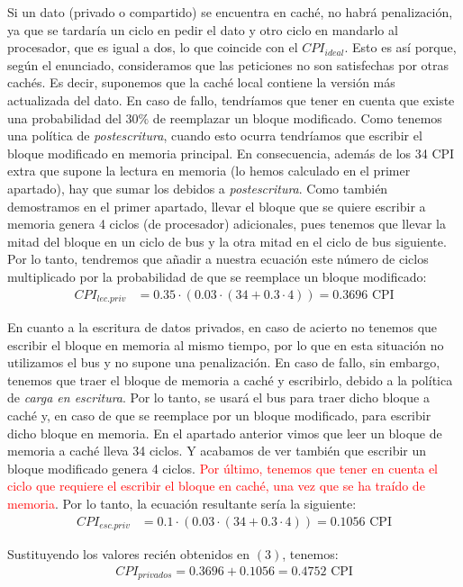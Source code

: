 \documentclass[12pt,a4paper]{article}
\begin{document}
Si un dato (privado o compartido) se encuentra en caché, no habrá penalización, ya que se tardaría un ciclo en pedir el dato y otro ciclo en mandarlo al procesador, que es igual a dos, lo que coincide con el $CPI_{ideal}$. Esto es así porque, según el enunciado, consideramos que las peticiones no son satisfechas por otras cachés. Es decir, suponemos que la caché local contiene la versión más actualizada del dato. En caso de fallo, tendríamos que tener en cuenta que existe una probabilidad del $30\%$ de reemplazar un bloque modificado. Como tenemos una política de \textit{postescritura}, cuando esto ocurra tendríamos que escribir el bloque modificado en memoria principal. En consecuencia, además de los 34 CPI extra que supone la lectura en memoria (lo hemos calculado en el primer apartado), hay que sumar los debidos a \textit{postescritura}. Como también demostramos en el primer apartado, llevar el bloque que se quiere escribir a memoria genera 4 ciclos (de procesador) adicionales, pues tenemos que llevar la mitad del bloque en un ciclo de bus y la otra mitad en el ciclo de bus siguiente. Por lo tanto, tendremos que añadir a nuestra ecuación este número de ciclos multiplicado por la probabilidad de que se reemplace un bloque modificado:
\begin{align*}
CPI_{lec.priv}&=0.35\cdot (0.03\cdot (34 + 0.3\cdot 4))=0.3696\text{ CPI}
\end{align*}

En cuanto a la escritura de datos privados, en caso de acierto no tenemos que escribir el bloque en memoria al mismo tiempo, por lo que en esta situación no utilizamos el bus y no supone una penalización. En caso de fallo, sin embargo, tenemos que traer el bloque de memoria a caché y escribirlo, debido a la política de \textit{carga en escritura}. Por lo tanto, se usará el bus para traer dicho bloque a caché y, en caso de que se reemplace por un bloque modificado, para escribir dicho bloque en memoria. En el apartado anterior vimos que leer un bloque de memoria a caché lleva 34 ciclos. Y acabamos de ver también que escribir un bloque modificado genera 4 ciclos. \textcolor{red}{Por último, tenemos que tener en cuenta el ciclo que requiere el escribir el bloque en caché, una vez que se ha traído de memoria}. Por lo tanto, la ecuación resultante sería la siguiente:
\begin{align*}
CPI_{esc.priv}&=0.1\cdot (0.03\cdot (34+0.3\cdot 4))=0.1056\text{ CPI}
\end{align*}

Sustituyendo los valores recién obtenidos en $(3)$, tenemos:
\begin{align*}
CPI_{privados}=0.3696+0.1056=0.4752 \text{ CPI}
\end{align*}
\end{document}

